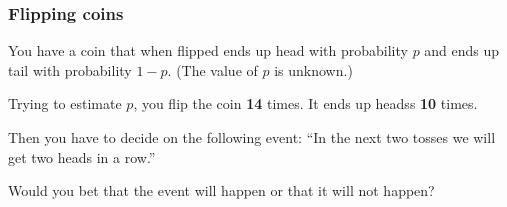 \begin{frame}

  \cnote{

  }
\end{frame}

\begin{frame}
  \frametitle{Flipping coins}

  You have a coin that when flipped ends up head with probability $p$
  and ends up tail with probability $1-p$. (The value of $p$ is
  unknown.)

  Trying to estimate $p$, you flip the coin \textbf{14} times. It ends
  up headss \textbf{10} times.

  Then you have to decide on the following event: ``In the next two
  tosses we will get two heads in a row.''

  Would you bet that the event will happen or that it will not happen?

  \vfill

  \cnote{

  }
\end{frame}

